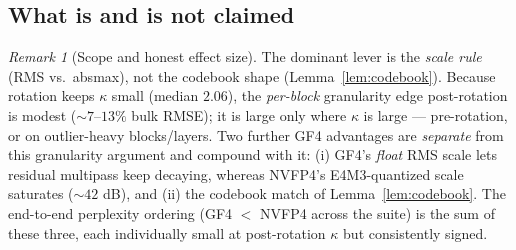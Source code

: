 \documentclass[11pt]{article}
\theoremstyle{remark}
\newtheorem{remark}{Remark}
\begin{document}
\subsection{What is and is not claimed}

\begin{remark}[Scope and honest effect size]
The dominant lever is the \emph{scale rule} (RMS vs.\ absmax), not the codebook
shape (Lemma~\ref{lem:codebook}). Because rotation keeps $\kappa$ small
(median $2.06$), the \emph{per-block} granularity edge post-rotation is modest
($\sim\!7$--$13\%$ bulk RMSE); it is large only where $\kappa$ is large ---
pre-rotation, or on outlier-heavy blocks/layers. Two further GF4 advantages are
\emph{separate} from this granularity argument and compound with it: (i) GF4's
\emph{float} RMS scale lets residual multipass keep decaying, whereas NVFP4's
E4M3-quantized scale saturates ($\sim\!42$ dB), and (ii) the codebook match of
Lemma~\ref{lem:codebook}. The end-to-end perplexity ordering
(GF4 $<$ NVFP4 across the suite) is the sum of these three, each individually
small at post-rotation $\kappa$ but consistently signed.
\end{remark}
\end{document}

